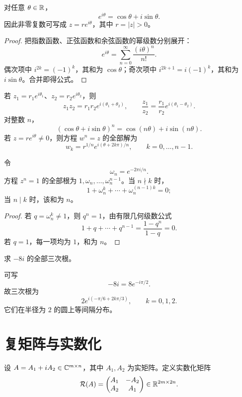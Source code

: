 \begin{theorem}[Euler 公式]
对任意 $\theta\in\mathbb{R}$，
\[
e^{i\theta}=\cos\theta+i\sin\theta.
\]
因此非零复数可写成 $z=re^{i\theta}$，其中 $r=|z|>0$。
\end{theorem}
\begin{proof}
把指数函数、正弦函数和余弦函数的幂级数分别展开：
\[
e^{i\theta}=\sum_{n=0}^{\infty}\frac{(i\theta)^n}{n!}.
\]
偶次项中 $i^{2k}=(-1)^k$，其和为 $\cos\theta$；奇次项中
$i^{2k+1}=i(-1)^k$，其和为 $i\sin\theta$。合并即得公式。
\end{proof}

\begin{corollary}[乘法、棣莫弗公式与开方]
若 $z_1=r_1e^{i\theta_1}$、$z_2=r_2e^{i\theta_2}$，则
\[
z_1z_2=r_1r_2e^{i(\theta_1+\theta_2)},
\qquad
\frac{z_1}{z_2}=\frac{r_1}{r_2}e^{i(\theta_1-\theta_2)}.
\]
对整数 $n$，
\[
(\cos\theta+i\sin\theta)^n
=\cos(n\theta)+i\sin(n\theta).
\]
若 $z=re^{i\theta}\ne0$，则方程 $w^n=z$ 的全部解为
\[
w_k=r^{1/n}e^{i(\theta+2k\pi)/n},
\qquad k=0,\ldots,n-1.
\]
\end{corollary}

\begin{definition}[单位根]
令
\[
\omega_n=e^{-2\pi i/n}.
\]
方程 $z^n=1$ 的全部根为
$1,\omega_n,\ldots,\omega_n^{n-1}$。当 $n\nmid k$ 时，
\[
1+\omega_n^k+\cdots+\omega_n^{(n-1)k}=0;
\]
当 $n\mid k$ 时，该和为 $n$。
\end{definition}
\begin{proof}
若 $q=\omega_n^k\ne1$，则 $q^n=1$，由有限几何级数公式
\[
1+q+\cdots+q^{n-1}=\frac{1-q^n}{1-q}=0.
\]
若 $q=1$，每一项均为 $1$，和为 $n$。
\end{proof}

\begin{example}[title={求复数的全部三次根}]
求 $-8i$ 的全部三次根。
\begin{solution}
可写
\[
-8i=8e^{-i\pi/2}.
\]
故三次根为
\[
2e^{i(-\pi/6+2k\pi/3)},
\qquad k=0,1,2.
\]
它们在半径为 $2$ 的圆上等间隔分布。
\end{solution}
\end{example}

\section{复矩阵与实数化}

设 $A=A_1+iA_2\in\mathbb{C}^{m\times n}$，其中 $A_1,A_2$ 为实矩阵。定义实数化矩阵
\[
\mathcal R(A)=
\begin{pmatrix}
A_1&-A_2\\
A_2&A_1
\end{pmatrix}\in\mathbb{R}^{2m\times2n}.
\]

